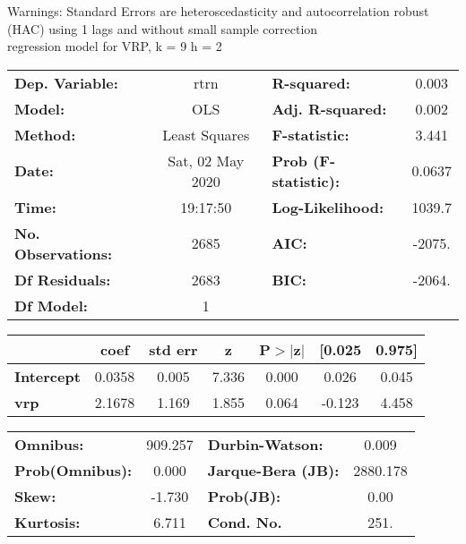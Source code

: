 Warnings: \newline
 [1] Standard Errors are heteroscedasticity and autocorrelation robust (HAC) using 1 lags and without small sample correction\\ 

regression model for VRP, k = 9 h = 2\begin{center}
\begin{tabular}{lclc}
\toprule
\textbf{Dep. Variable:}    &       rtrn       & \textbf{  R-squared:         } &     0.003   \\
\textbf{Model:}            &       OLS        & \textbf{  Adj. R-squared:    } &     0.002   \\
\textbf{Method:}           &  Least Squares   & \textbf{  F-statistic:       } &     3.441   \\
\textbf{Date:}             & Sat, 02 May 2020 & \textbf{  Prob (F-statistic):} &   0.0637    \\
\textbf{Time:}             &     19:17:50     & \textbf{  Log-Likelihood:    } &    1039.7   \\
\textbf{No. Observations:} &        2685      & \textbf{  AIC:               } &    -2075.   \\
\textbf{Df Residuals:}     &        2683      & \textbf{  BIC:               } &    -2064.   \\
\textbf{Df Model:}         &           1      & \textbf{                     } &             \\
\bottomrule
\end{tabular}
\begin{tabular}{lcccccc}
                   & \textbf{coef} & \textbf{std err} & \textbf{z} & \textbf{P$> |$z$|$} & \textbf{[0.025} & \textbf{0.975]}  \\
\midrule
\textbf{Intercept} &       0.0358  &        0.005     &     7.336  &         0.000        &        0.026    &        0.045     \\
\textbf{vrp}       &       2.1678  &        1.169     &     1.855  &         0.064        &       -0.123    &        4.458     \\
\bottomrule
\end{tabular}
\begin{tabular}{lclc}
\textbf{Omnibus:}       & 909.257 & \textbf{  Durbin-Watson:     } &    0.009  \\
\textbf{Prob(Omnibus):} &   0.000 & \textbf{  Jarque-Bera (JB):  } & 2880.178  \\
\textbf{Skew:}          &  -1.730 & \textbf{  Prob(JB):          } &     0.00  \\
\textbf{Kurtosis:}      &   6.711 & \textbf{  Cond. No.          } &     251.  \\
\bottomrule
\end{tabular}
\end{center}

